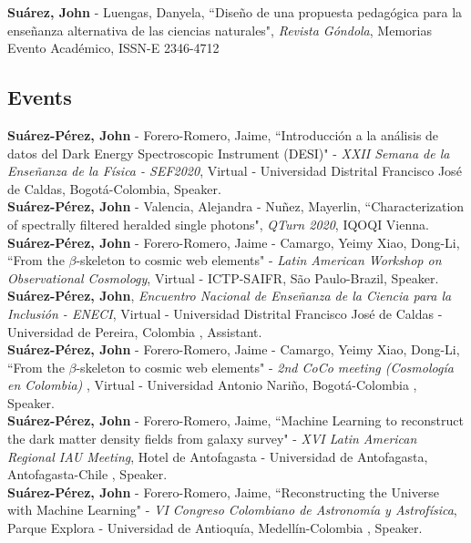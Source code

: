 \documentclass[10pt, a4paper]{article}
\newcommand{\years}[1]{\marginnote{\scriptsize #1}}
\begin{document}
\years{2014}\textbf{Suárez, John} - Luengas, Danyela, “Diseño de una propuesta pedagógica para la enseñanza alternativa de las ciencias naturales", \emph{Revista Góndola}, Memorias Evento Académico, ISSN-E 2346-4712 \\

\subsection*{Events}
\noindent
\years{2020}\textbf{Suárez-Pérez, John} - Forero-Romero, Jaime, “Introducción a la análisis de datos del Dark Energy Spectroscopic Instrument (DESI)" - \emph{XXII Semana de la Enseñanza de la Física - SEF2020}, Virtual - Universidad Distrital Francisco José de Caldas, Bogotá-Colombia, Speaker.\\

\years{2020}\textbf{Suárez-Pérez, John} - Valencia, Alejandra - Nuñez, Mayerlin, “Characterization of spectrally filtered heralded single photons", \emph{QTurn 2020}, IQOQI Vienna.\\

\years{2020}\textbf{Suárez-Pérez, John} - Forero-Romero, Jaime - Camargo, Yeimy  Xiao, Dong-Li, “From the $\beta$-skeleton to cosmic web elements" - \emph{Latin American Workshop on Observational Cosmology}, Virtual - ICTP-SAIFR, São Paulo-Brazil, Speaker.\\

\years{2020}\textbf{Suárez-Pérez, John}, \emph{Encuentro Nacional de Enseñanza de la Ciencia para la Inclusión - ENECI}, Virtual - Universidad Distrital Francisco José de Caldas - Universidad de Pereira, Colombia , Assistant.\\

\years{2020}\textbf{Suárez-Pérez, John} - Forero-Romero, Jaime - Camargo, Yeimy  Xiao, Dong-Li, “From the $\beta$-skeleton to cosmic web elements" - \emph{2nd CoCo meeting (Cosmología en Colombia) }, Virtual - Universidad Antonio Nariño, Bogotá-Colombia , Speaker.\\

\years{2019}\textbf{Suárez-Pérez, John} - Forero-Romero, Jaime, “Machine Learning to reconstruct the dark matter density fields from galaxy survey" - \emph{XVI Latin American Regional IAU Meeting}, Hotel de Antofagasta - Universidad de Antofagasta, Antofagasta-Chile , Speaker.\\

\years{2019}\textbf{Suárez-Pérez, John} - Forero-Romero, Jaime, “Reconstructing the Universe with Machine Learning" - \emph{VI Congreso Colombiano de Astronomía y Astrofísica}, Parque Explora - Universidad de Antioquía, Medellín-Colombia , Speaker.\\
\end{document}
